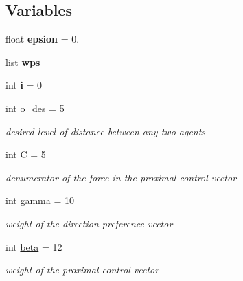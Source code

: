 \subsection*{Variables}
\begin{DoxyCompactItemize}
\item 
\mbox{\label{namespaceagent__driver_afe4d59e32838cbab143b90af1103cba9}} 
float {\bfseries epsion} = 0.
\item 
list {\bfseries wps}
\item 
\mbox{\label{namespaceagent__driver_a385f0708d1616008a95c5c51331c3395}} 
int {\bfseries i} = 0
\item 
\mbox{\label{namespaceagent__driver_afa84d8b37bda7e27d006422ae25c7ade}} 
int \hyperlink{namespaceagent__driver_afa84d8b37bda7e27d006422ae25c7ade}{o\+\_\+des} = 5
\begin{DoxyCompactList}\small\item\em desired level of distance between any two agents \end{DoxyCompactList}\item 
\mbox{\label{namespaceagent__driver_ae1469a5763093bc8ac47f837fd58bc9c}} 
int \hyperlink{namespaceagent__driver_ae1469a5763093bc8ac47f837fd58bc9c}{C} = 5
\begin{DoxyCompactList}\small\item\em denumerator of the force in the proximal control vector \end{DoxyCompactList}\item 
\mbox{\label{namespaceagent__driver_af804ab7d71c017a84796b859dc03f9b6}} 
int \hyperlink{namespaceagent__driver_af804ab7d71c017a84796b859dc03f9b6}{gamma} = 10
\begin{DoxyCompactList}\small\item\em weight of the direction preference vector \end{DoxyCompactList}\item 
\mbox{\label{namespaceagent__driver_a19ad1680988a89c19242137b0124df38}} 
int \hyperlink{namespaceagent__driver_a19ad1680988a89c19242137b0124df38}{beta} = 12
\begin{DoxyCompactList}\small\item\em weight of the proximal control vector \end{DoxyCompactList}\item 

\end{DoxyCompactItemize}
